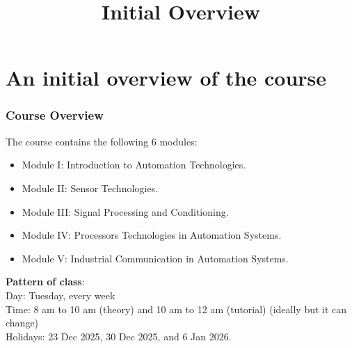\section{An initial overview of the course}
\title[Initial overview]{Initial Overview}

\begin{frame}
	\frametitle{Course Overview}
The course contains the following 6 modules:
		\begin{itemize}
		  \item Module I:  Introduction to Automation Technologies.
		  \item Module II: Sensor Technologies.
		  \item Module III: Signal Processing and Conditioning.
		  \item Module IV: Processors Technologies in Automation Systems.
		  \item Module V: Industrial Communication in Automation Systems.
		\end{itemize}
\textbf{Pattern of class}: \\ Day: Tuesday, every week \\ 
Time: 8 am to 10 am (theory) and 10 am to 12 am (tutorial) (ideally but it can change) \\
Holidays: 23 Dec 2025, 30 Dec 2025, and 6 Jan 2026. %
\end{frame}

